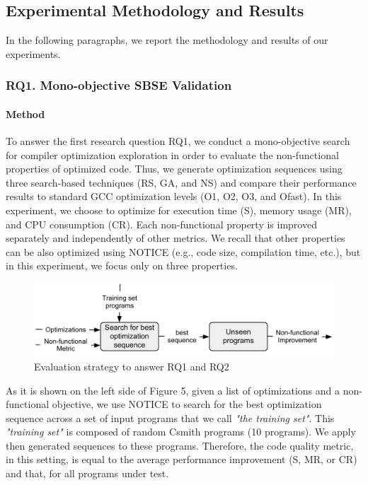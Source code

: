\subsection{Experimental Methodology and Results}
In the following paragraphs, we report the methodology and results of our experiments.

\subsubsection{RQ1. Mono-objective SBSE Validation}
\paragraph{Method}

To answer the first research question RQ1, we conduct a mono-objective search for compiler optimization exploration in order to evaluate the non-functional properties of optimized code. Thus, we generate optimization sequences using three search-based techniques (RS, GA, and NS) and compare their performance results to standard GCC optimization levels (O1, O2, O3, and Ofast). 
In this experiment, we choose to optimize for execution time (S), memory usage (MR), and CPU consumption (CR). Each non-functional property is improved separately and independently of other metrics. We recall that other properties can be also optimized using NOTICE (e.g., code size, compilation time, etc.), but in this experiment, we focus only on three properties.
\vspace{-1em}
\begin{figure}[h]
	\centering
	\includegraphics[width=1.\linewidth]{chapitre3/fig/sensitivity.pdf}
	\caption{Evaluation strategy to answer RQ1 and RQ2}
	
\end{figure}

\setlength\abovecaptionskip{0.25ex}
As it is shown on the left side of Figure 5, given a list of optimizations and a non-functional objective, we use NOTICE to search for the best optimization sequence across a set of input programs that we call \textit{"the training set"}. This \textit{"training set"} is composed of random Csmith programs (10 programs). We apply then generated sequences to these programs. Therefore, the code quality metric, in this setting, is equal to the average performance improvement (S, MR, or CR) and that, for all programs under test. 

